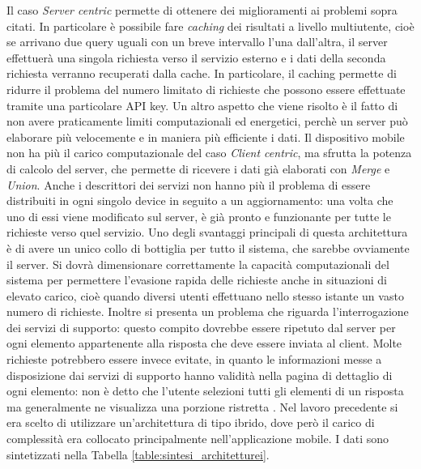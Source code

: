 Il caso \emph{Server centric} permette di ottenere dei miglioramenti ai problemi sopra citati. In particolare è possibile fare \emph{caching} dei risultati a livello multiutente, cioè se arrivano due query uguali con un breve intervallo l'una dall'altra, il server effettuerà una singola richiesta verso il servizio esterno e i dati della seconda richiesta verranno recuperati dalla cache. In particolare, il caching permette di ridurre il problema del numero limitato di richieste che possono essere effettuate tramite una particolare API key. Un altro aspetto che viene risolto è il fatto di non avere praticamente limiti computazionali ed energetici, perchè un server può elaborare più velocemente e in maniera più efficiente i dati. Il dispositivo mobile non ha più il carico computazionale del caso \emph{Client centric}, ma sfrutta la potenza di calcolo del server, che permette di ricevere i dati già elaborati con \emph{Merge} e \emph{Union}. Anche i descrittori dei servizi non hanno più il problema di essere distribuiti in ogni singolo device in seguito a un aggiornamento: una volta che uno di essi viene modificato sul server, è già pronto e funzionante per tutte le richieste verso quel servizio.
Uno degli svantaggi principali di questa architettura è di avere un unico collo di bottiglia per tutto il sistema, che sarebbe ovviamente il server. Si dovrà dimensionare correttamente la capacità computazionali del sistema per permettere l'evasione rapida delle richieste anche in situazioni di elevato carico, cioè quando diversi utenti effettuano nello stesso istante un vasto numero di richieste. Inoltre si presenta un problema che riguarda l'interrogazione dei servizi di supporto: questo compito dovrebbe essere ripetuto dal server per ogni elemento appartenente alla risposta che deve essere inviata al client. Molte richieste potrebbero essere invece evitate, in quanto le informazioni messe a disposizione dai servizi di supporto hanno validità nella pagina di dettaglio di ogni elemento: non è detto che l'utente selezioni tutti gli elementi di un risposta ma generalmente ne visualizza una porzione ristretta \cite{van2009using}. Nel lavoro precedente \cite{rizzo2015progettazione} si era scelto di utilizzare un'architettura di tipo ibrido, dove però il carico di complessità era collocato principalmente nell'applicazione mobile.
I dati sono sintetizzati nella Tabella \ref{table:sintesi_architetturei}.

